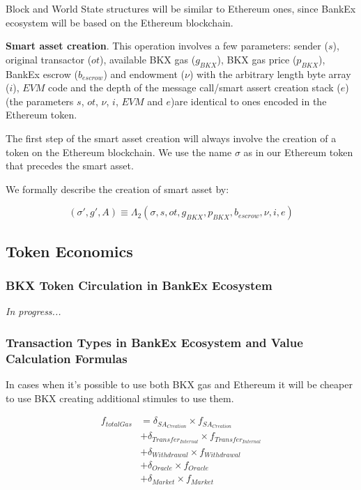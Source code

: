 \documentclass{article}
\begin{document}
\begin{multicols}{2}
Block and World State \cite{wood2014ethereum} structures will be similar to Ethereum ones, since BankEx ecosystem will be based on the Ethereum blockchain.

\textbf{Smart asset creation}. This operation involves a few parameters: sender ($s$), original transactor ($ot$), available BKX gas ($g_{BKX}$), BKX gas price ($p_{BKX}$), BankEx escrow ($b_{escrow}$) and endowment ($\nu$) with the arbitrary length byte array ($i$), $EVM$ code and the depth of the message call/smart assert creation stack ($e$) (the parameters $s$, $ot$, $\nu$, $i$, $EVM$ and $e$)are identical to ones encoded in the Ethereum token.

The first step of the smart asset creation will always involve the creation of a token on the Ethereum blockchain. We use the name $\sigma$ as in our Ethereum token that precedes the smart asset.

We formally describe the creation of smart asset by:

\begin{equation}
    \left(\sigma', g', A\right) \equiv \Lambda_2\left(\sigma, s, ot, g_{BKX}, p_{BKX}, b_{escrow}, \nu, i, e\right)
\end{equation}

\subsection{Token Economics}

\subsubsection{BKX Token Circulation in BankEx Ecosystem}

\textit{In progress...}

\subsubsection{Transaction Types in BankEx Ecosystem and Value Calculation Formulas}

In cases when it's possible to use both BKX gas and Ethereum it will be cheaper to use BKX creating additional stimules to use them.

\begin{equation}
	\begin{split}
    	f_{totalGas} & = \delta_{SA_{Creation}} \times f_{SA_{Creation}} \\
    	& + \delta_{Transfer_{Internal}} \times f_{Transfer_{Internal}} \\
    	& + \delta_{Withdrawal} \times f_{Withdrawal} \\
    	& + \delta_{Oracle} \times f_{Oracle} \\
    	& + \delta_{Market} \times f_{Market}
    \end{split}
\end{equation}


\end{multicols}
\end{document}

